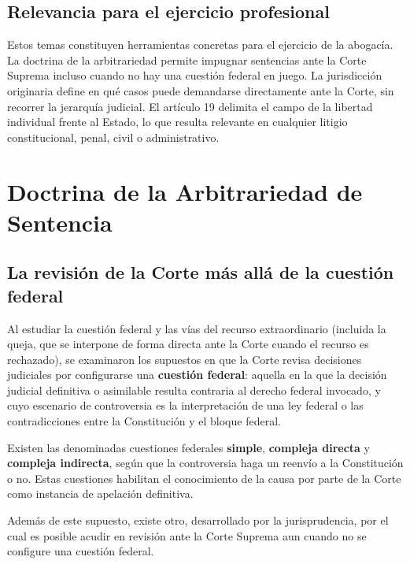 \documentclass[12pt,oneside]{book}
\begin{document}
\section{Relevancia para el ejercicio profesional}

Estos temas constituyen herramientas concretas para el ejercicio de la abogacía. La doctrina de la arbitrariedad permite impugnar sentencias ante la Corte Suprema incluso cuando no hay una cuestión federal en juego. La jurisdicción originaria define en qué casos puede demandarse directamente ante la Corte, sin recorrer la jerarquía judicial. El artículo 19 delimita el campo de la libertad individual frente al Estado, lo que resulta relevante en cualquier litigio constitucional, penal, civil o administrativo.


\chapter[Doctrina de la Arbitrariedad]{Doctrina de la Arbitrariedad de Sentencia}

\section{La revisión de la Corte más allá de la cuestión federal}

Al estudiar la cuestión federal y las vías del recurso extraordinario (incluida la queja, que se interpone de forma directa ante la Corte cuando el recurso es rechazado), se examinaron los supuestos en que la Corte revisa decisiones judiciales por configurarse una \textbf{cuestión federal}: aquella en la que la decisión judicial definitiva o asimilable resulta contraria al derecho federal invocado, y cuyo escenario de controversia es la interpretación de una ley federal o las contradicciones entre la Constitución y el bloque federal.

Existen las denominadas cuestiones federales \textbf{simple}, \textbf{compleja directa} y \textbf{compleja indirecta}, según que la controversia haga un reenvío a la Constitución o no. Estas cuestiones habilitan el conocimiento de la causa por parte de la Corte como instancia de apelación definitiva.

Además de este supuesto, existe otro, desarrollado por la jurisprudencia, por el cual es posible acudir en revisión ante la Corte Suprema aun cuando no se configure una cuestión federal.
\end{document}
